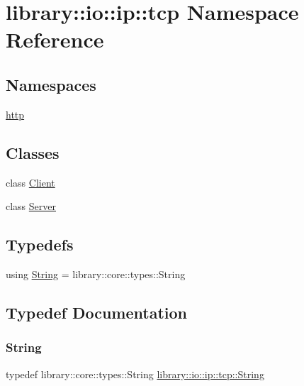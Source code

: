 \hypertarget{namespacelibrary_1_1io_1_1ip_1_1tcp}{}\section{library\+:\+:io\+:\+:ip\+:\+:tcp Namespace Reference}
\label{namespacelibrary_1_1io_1_1ip_1_1tcp}
\subsection*{Namespaces}
\begin{DoxyCompactItemize}
\item 
 \hyperlink{namespacelibrary_1_1io_1_1ip_1_1tcp_1_1http}{http}
\end{DoxyCompactItemize}
\subsection*{Classes}
\begin{DoxyCompactItemize}
\item 
class \hyperlink{classlibrary_1_1io_1_1ip_1_1tcp_1_1_client}{Client}
\item 
class \hyperlink{classlibrary_1_1io_1_1ip_1_1tcp_1_1_server}{Server}
\end{DoxyCompactItemize}
\subsection*{Typedefs}
\begin{DoxyCompactItemize}
\item 
using \hyperlink{namespacelibrary_1_1io_1_1ip_1_1tcp_a3ffb785d0c06077d01e52b17cb183916}{String} = library\+::core\+::types\+::\+String
\end{DoxyCompactItemize}


\subsection{Typedef Documentation}
\mbox{\label{namespacelibrary_1_1io_1_1ip_1_1tcp_a3ffb785d0c06077d01e52b17cb183916}} 
\subsubsection{\texorpdfstring{String}{String}}
{\footnotesize\ttfamily typedef library\+::core\+::types\+::\+String \hyperlink{namespacelibrary_1_1io_1_1ip_1_1tcp_a3ffb785d0c06077d01e52b17cb183916}{library\+::io\+::ip\+::tcp\+::\+String}}

